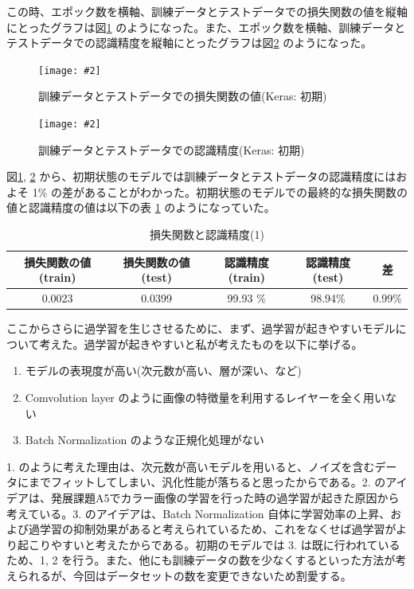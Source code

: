 \documentclass[a4paper,dvipdfmx]{jsarticle}
\newcommand{\image}[3]{
    \begin{figure}[H]
        \begin{center}
        \texttt{[image: \#2]}
        \end{center}
        \caption{#1}
        \label{#3}
    \end{figure}
}
\begin{document}
この時、エポック数を横軸、訓練データとテストデータでの損失関数の値を縦軸にとったグラフは図\ref{fig-B1-1-1} のようになった。また、エポック数を横軸、訓練データとテストデータでの認識精度を縦軸にとったグラフは図\ref{fig-B1-1-2} のようになった。

\image{訓練データとテストデータでの損失関数の値(Keras: 初期)}{report_b1-1-1.png}{fig-B1-1-1}
\image{訓練データとテストデータでの認識精度(Keras: 初期)}{report_b1-1-2.png}{fig-B1-1-2}

図\ref{fig-B1-1-1}, \ref{fig-B1-1-2} から、初期状態のモデルでは訓練データとテストデータの認識精度にはおよそ 1\% の差があることがわかった。初期状態のモデルでの最終的な損失関数の値と認識精度の値は以下の表 \ref{tableB1-1} のようになっていた。

\begin{table}[H]
\begin{center}
\caption{損失関数と認識精度(1)}
  \begin{tabular}{|c|c||c|c|c|} \hline
    損失関数の値(train) & 損失関数の値(test) & 認識精度(train) & 認識精度(test) & 差 \\ \hline \hline
    0.0023 & 0.0399 & 99.93 \% & 98.94\% & 0.99\% \\ \hline
  \end{tabular}
	\label{tableB1-1}
\end{center}
\end{table}

ここからさらに過学習を生じさせるために、まず、過学習が起きやすいモデルについて考えた。過学習が起きやすいと私が考えたものを以下に挙げる。
\begin{enumerate}
\item モデルの表現度が高い(次元数が高い、層が深い、など)
\item Comvolution layer のように画像の特徴量を利用するレイヤーを全く用いない
\item Batch Normalization のような正規化処理がない
\end{enumerate}

1. のように考えた理由は、次元数が高いモデルを用いると、ノイズを含むデータにまでフィットしてしまい、汎化性能が落ちると思ったからである。2. のアイデアは、発展課題A5でカラー画像の学習を行った時の過学習が起きた原因から考えている。3. のアイデアは、Batch Normalization 自体に学習効率の上昇、および過学習の抑制効果があると考えられているため、これをなくせば過学習がより起こりやすいと考えたからである。初期のモデルでは 3. は既に行われているため、1, 2 を行う。また、他にも訓練データの数を少なくするといった方法が考えられるが、今回はデータセットの数を変更できないため割愛する。\\
\end{document}
